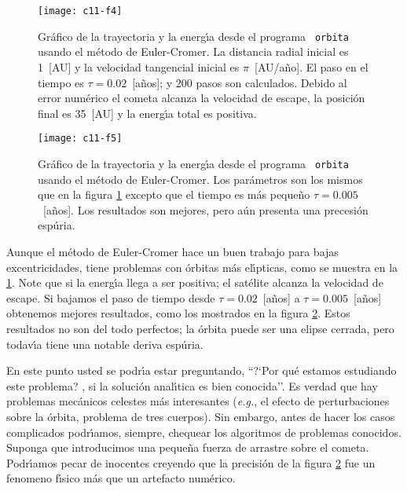 \begin{figure}[!h]
\begin{center}
\texttt{[image: c11-f4]}
\caption{Gr{\'a}fico de la trayectoria y la energ{\'\i}a desde el programa {\tt
    orbita} usando el m{\'e}todo de Euler-Cromer. La distancia radial
  inicial es 1~[AU] y la velocidad tangencial inicial es $\pi$~[AU/a{\~n}o].
  El paso en el tiempo es $\tau=0.02$~[a{\~n}os]; y 200 pasos son calculados.
  Debido al error num{\'e}rico el cometa alcanza la velocidad de escape,
  la posici{\'o}n final es 35~[AU] y la energ{\'\i}a total es
  positiva.}\label{c11-f4}
\end{center}
\end{figure}


\begin{figure}[!h]
\begin{center}
\texttt{[image: c11-f5]}
\caption{Gr{\'a}fico de la trayectoria y la energ{\'\i}a desde el programa {\tt
    orbita} usando el m{\'e}todo de Euler-Cromer. Los par{\'a}metros son los
  mismos que en la figura \ref{c11-f4} excepto que el tiempo es m{\'a}s
  peque{\~n}o $\tau=0.005$~[a{\~n}os]. Los resultados son mejores, pero a{\'u}n presenta
  una precesi{\'o}n esp{\'u}ria.}\label{c11-f5}
\end{center}
\end{figure}

Aunque el m{\'e}todo de Euler-Cromer hace un buen trabajo para bajas
excentricidades, tiene problemas con {\'o}rbitas m{\'a}s el{\'\i}pticas, como se
muestra en la \ref{c11-f4}. Note que si la energ{\'\i}a llega a ser
positiva; el sat{\'e}lite alcanza la velocidad de escape. Si bajamos el
paso de tiempo desde $\tau=0.02$~[a{\~n}os] a $\tau=0.005$~[a{\~n}os] obtenemos
mejores resultados, como los mostrados en la figura \ref{c11-f5}.
Estos resultados no son del todo perfectos; la {\'o}rbita puede ser una
elipse cerrada, pero todav{\'\i}a tiene una notable deriva esp{\'u}ria.

En este punto usted se podr{\'\i}a estar preguntando, ``?`Por qu{\'e} estamos
estudiando este problema? , si la soluci{\'o}n anal{\'\i}tica es bien
conocida''.  Es verdad que hay problemas mec{\'a}nicos celestes m{\'a}s
interesantes ({\it e.g.}, el efecto de perturbaciones sobre la {\'o}rbita,
problema de tres cuerpos). Sin embargo, antes de hacer los casos
complicados podr{\'\i}amos, siempre, chequear los algoritmos de problemas
conocidos. Suponga que introducimos una peque{\~n}a fuerza de arrastre
sobre el cometa. Podr{\'\i}amos pecar de inocentes creyendo que la
precisi{\'o}n de la figura \ref{c11-f5} fue un fenomeno f{\'\i}sico m{\'a}s que un
artefacto num{\'e}rico.

